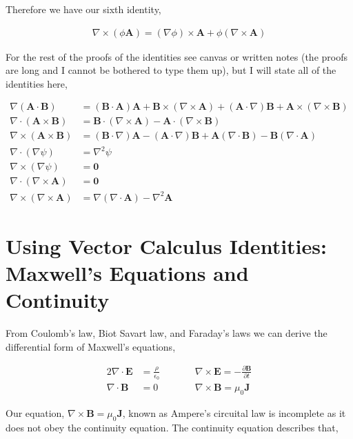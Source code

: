 \documentclass[11pt]{amsart}
\begin{document}
Therefore we have our sixth identity,

\begin{align*}
  \nabla\times(\phi\mathbf{A}) = (\nabla\phi)\times\mathbf{A} + \phi(\nabla\times\mathbf{A})
\end{align*}

For the rest of the proofs of the identities see canvas or written notes (the proofs are long and I cannot be bothered to type them up), but I will state all of the identities here,

\begin{align*}
  \nabla(\mathbf{A}\cdot\mathbf{B}) &= (\mathbf{B}\cdot\mathbf{A})\mathbf{A}+\mathbf{B}\times(\nabla\times\mathbf{A})+(\mathbf{A}\cdot\nabla)\mathbf{B}+\mathbf{A}\times(\nabla\times\mathbf{B}) \\
  \nabla\cdot(\mathbf{A}\times\mathbf{B}) &= \mathbf{B}\cdot(\nabla\times\mathbf{A}) - \mathbf{A}\cdot(\nabla\times\mathbf{B}) \\
  \nabla\times(\mathbf{A}\times\mathbf{B}) &= (\mathbf{B}\cdot\nabla)\mathbf{A}-(\mathbf{A}\cdot\nabla)\mathbf{B}+\mathbf{A}(\nabla\cdot\mathbf{B})-\mathbf{B}(\nabla\cdot\mathbf{A}) \\
  \nabla\cdot(\nabla\psi) &= \nabla^2 \psi \\
  \nabla\times(\nabla\psi) &= \mathbf{0} \\
  \nabla\cdot(\nabla\times\mathbf{A}) &= \mathbf{0} \\
  \nabla\times(\nabla\times\mathbf{A}) &= \nabla(\nabla\cdot\mathbf{A}) - \nabla^2 \mathbf{A}
\end{align*}

\section{Using Vector Calculus Identities: Maxwell's Equations and Continuity}

From Coulomb's law, Biot Savart law, and Faraday's laws we can derive the differential form of Maxwell's equations,

\begin{alignat*}{2}
  \nabla \cdot \mathbf{E} &= \frac{\rho}{\epsilon_0} \qquad &&\nabla \times \mathbf{E} = -\frac{\partial\mathbf{B}}{\partial t} \\
  \nabla \cdot \mathbf{B} &= 0 \qquad &&\nabla \times \mathbf{B} = \mu_0 \mathbf{J}
\end{alignat*}

Our equation, $\nabla\times\mathbf{B} = \mu_0 \mathbf{J}$, known as Ampere's circuital law is incomplete as it does not obey the continuity equation. The continuity equation describes that,
\end{document}
